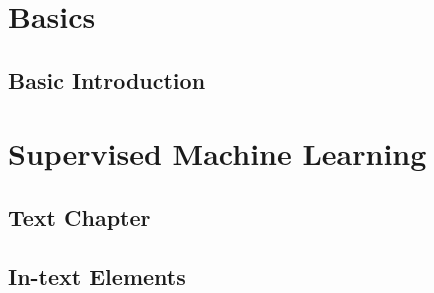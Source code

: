 \documentclass[11pt,fleqn]{book} %
\begin{document}


\pagestyle{empty} %

\tableofcontents %

\cleardoublepage %

\pagestyle{fancy} %


\part{Basics}


\chapter{Basic Introduction}

%

\part{Supervised Machine Learning}


\chapter{Text Chapter}

%

\chapter{In-text Elements}
\end{document}
